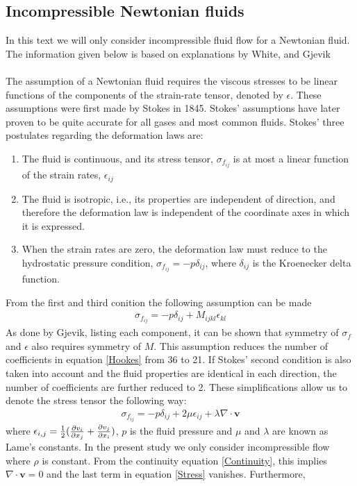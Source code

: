 \subsection{Incompressible Newtonian fluids}
In this text we will only consider incompressible fluid flow for a Newtonian fluid. The information given below is based on explanations by White, \cite[pp. 65-66]{Whit06} and Gjevik \cite{Gjev02}
\\
\\
The assumption of a Newtonian fluid requires the viscous stresses to be linear functions of the components of the strain-rate tensor, denoted by $\epsilon$. These assumptions were first made by Stokes in 1845. Stokes' assumptions have later proven to be quite accurate for all gases and most common fluids. Stokes' three postulates regarding the deformation laws are:
\begin{enumerate}
\item The fluid is continuous, and its stress tensor, $\sigma_{f_{ij}}$ is at most a linear function of the strain rates, $\epsilon_{ij}$ 
\item The fluid is isotropic, i.e., its properties are independent of direction, and therefore the deformation law is independent of the coordinate axes in which it is expressed. 
\item When the strain rates are zero, the deformation law must reduce to the hydrostatic pressure condition, $\sigma_{f_{ij}} = -p\delta_{ij}$, where $\delta_{ij}$ is the Kroenecker delta function. 
\end{enumerate}
From the first and third conition the following assumption can be made
\begin{align}
\sigma_{f_{ij}} = -p\delta_{ij} + M_{ijkl}\epsilon_{kl} \label{Hookes}
\end{align}
As done by Gjevik, listing each component, it can be shown that symmetry of $\sigma_f$ and $\epsilon$ also requires symmetry of $M$. This assumption reduces the number of coefficients in equation \eqref{Hookes} from 36 to 21. If Stokes' second condition is also taken into account and the fluid properties are identical in each direction, the number of coefficients are further reduced to 2. These simplifications allow us to denote the stress tensor the following way:
\begin{align}
\sigma_{f_{ij}} = -p\delta_{ij} + 2\mu\epsilon_{ij} + \lambda \nabla \cdot \mathbf{v} \label{Stress}
\end{align}
where $\epsilon_{i,j} = \frac{1}{2}(\frac{\partial v_i}{\partial x_j} + \frac{\partial v_j}{\partial x_i})$, $p$ is the fluid pressure and $\mu$ and $\lambda$ are known as Lame's constants. In the present study we only consider incompressible flow where $\rho$ is constant. From the continuity equation \eqref{Continuity}, this implies $\nabla \cdot \mathbf{v} = 0$ and the last term in equation \eqref{Stress} vanishes. Furthermore, 
